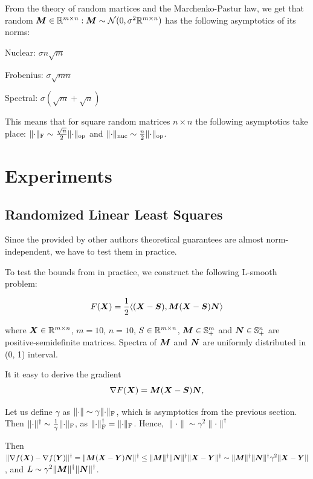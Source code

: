 \documentclass{article} %
\newcommand{\norm}[1]{\lVert #1\rVert}
\newcommand{\Rmn}{\R^{m\times n}}
\newcommand{\cN}{\mathcal{N}}
\DeclarePairedDelimiter{\normf}{\|}{\|_\mathrm{F}}
\DeclarePairedDelimiter{\norms}{\|}{\|_{\mathrm{op}}}
\DeclarePairedDelimiter{\normn}{\|}{\|_{\mathrm{nuc}}}
\def\<#1,#2>{\langle #1,#2\rangle}
\begin{document}
    From the theory of random martices and the Marchenko-Pastur law, we get that random $\mM \in \Rmn: \mM \sim \cN(0, \sigma^2 \Rmn)$ has the following asymptotics of its norms:

    Nuclear: $\sigma n \sqrt{m}$

    Frobenius: $\sigma \sqrt{m n}$
    
    Spectral: $\sigma(\sqrt{m} + \sqrt{n})$

    This means that for square random matrices $n \times n$  the following asymptotics take place: $\normf{\cdot} \sim \frac{\sqrt{n}}{2}\norms{\cdot}$ and $\normn{\cdot} \sim \frac{n}{2}\norms{\cdot}$.


\section{Experiments}
    \subsection{Randomized Linear Least Squares}
    Since the provided by other authors \cite{kovalev2025understanding,riabinin2025gluon} theoretical guarantees are almost norm-independent, we have to test them in practice.

    To test the bounds from \cite{kovalev2025understanding} in practice, we construct the following L-smooth problem:

    \begin{equation}\label{eq:lls}
        F(\mX) = \frac{1}{2} \<(\mX-\mS), \mM (\mX - \mS) \mN>
    \end{equation}

    where $\mX \in \Rmn$, $m=10$, $n=10$, $S \in \Rmn$, ${\bm{M}} \in \mathbb{S}^m_{+}$ and ${\bm{N}} \in \mathbb{S}^n_{+}$ are positive-semidefinite matrices. Spectra of ${\bm{M}}$ and ${\bm{N}}$ are uniformly distributed in (0, 1) interval.

    It it easy to derive the gradient
    \begin{equation}\label{eq:grad_lls}
        \nabla F({\bm{X}}) = {\bm{M}} ({\bm{X}} - {\bm{S}}) {\bm{N}},
    \end{equation}

    Let us define $\gamma$ as $\norm{\cdot} \sim \gamma \normf{\cdot}$, which is asymptotics from the previous section. Then $\norm{\cdot}^\dagger \sim \frac{1}{\gamma}\normf{\cdot}$, as $\normf{\cdot}^\dagger = \normf{\cdot}$. Hence, $\norm{\cdot} \sim \gamma^2 \norm{\cdot}^\dagger$

    Then $\norm{\nabla f(\mX) - \nabla f(\mY)}^\dagger = \norm{\mM (\mX - \mY) \mN}^\dagger \leq \norm{\mM}^\dagger \norm{\mN}^\dagger \norm{\mX - \mY}^\dagger \sim \norm{\mM}^\dagger \norm{\mN}^\dagger \gamma^2 \norm{\mX - \mY}$, and $L \sim \gamma^2 \norm{\mM}^\dagger \norm{\mN}^\dagger$.
    
\end{document}
